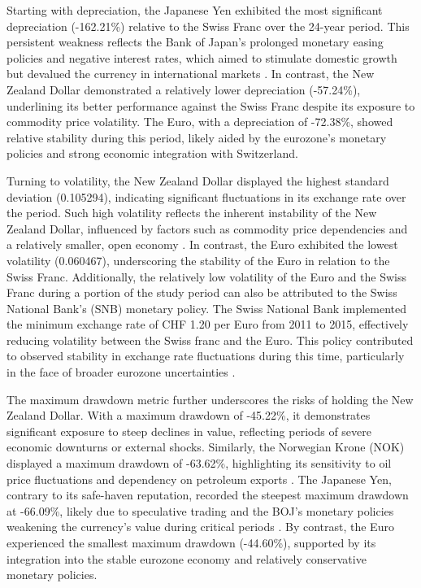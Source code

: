 \documentclass[11pt,a4paper,english,oneside]{book}
\begin{document}
Starting with depreciation, the Japanese Yen exhibited the most significant depreciation (-162.21\%) relative to the Swiss Franc over the 24-year period. This persistent weakness reflects the Bank of Japan's prolonged monetary easing policies and negative interest rates, which aimed to stimulate domestic growth but devalued the currency in international markets \parencite{shirai2020bank}. In contrast, the New Zealand Dollar demonstrated a relatively lower depreciation (-57.24\%), underlining its better performance against the Swiss Franc despite its exposure to commodity price volatility. The Euro, with a depreciation of -72.38\%, showed relative stability during this period, likely aided by the eurozone's monetary policies and strong economic integration with Switzerland.

Turning to volatility, the New Zealand Dollar displayed the highest standard deviation (0.105294), indicating significant fluctuations in its exchange rate over the period. Such high volatility reflects the inherent instability of the New Zealand Dollar, influenced by factors such as commodity price dependencies and a relatively smaller, open economy \parencite{chen2003commodity}. In contrast, the Euro exhibited the lowest volatility (0.060467), underscoring the stability of the Euro in relation to the Swiss Franc. Additionally, the relatively low volatility of the Euro and the Swiss Franc during a portion of the study period can also be attributed to the Swiss National Bank’s (SNB) monetary policy. The Swiss National Bank implemented the minimum exchange rate of CHF 1.20 per Euro from 2011 to 2015, effectively reducing volatility between the Swiss franc and the Euro. This policy contributed to observed stability in exchange rate fluctuations during this time, particularly in the face of broader eurozone uncertainties \parencite{auer2015safe}.

The maximum drawdown metric further underscores the risks of holding the New Zealand Dollar. With a maximum drawdown of -45.22\%, it demonstrates significant exposure to steep declines in value, reflecting periods of severe economic downturns or external shocks. Similarly, the Norwegian Krone (NOK) displayed a maximum drawdown of -63.62\%, highlighting its sensitivity to oil price fluctuations and dependency on petroleum exports \parencite{bergholt2016business}. The Japanese Yen, contrary to its safe-haven reputation, recorded the steepest maximum drawdown at -66.09\%, likely due to speculative trading and the BOJ's monetary policies weakening the currency's value during critical periods \parencite{shirai2020bank}. By contrast, the Euro experienced the smallest maximum drawdown (-44.60\%), supported by its integration into the stable eurozone economy and relatively conservative monetary policies.
\end{document}
